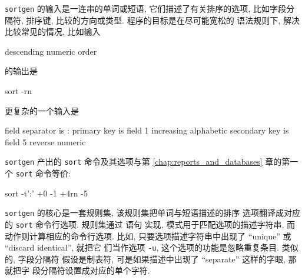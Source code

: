 \texttt{sortgen} 的输入是一连串的单词或短语, 它们描述了有关排序的选项,
比如字段分隔符, 排序键, 比较的方向或类型. 程序的目标是在尽可能宽松的
语法规则下, 解决比较常见的情况, 比如输入
\begin{awkcode}
    descending numeric order
\end{awkcode}
的输出是
\begin{awkcode}
    sort -rn
\end{awkcode}
更复杂的一个输入是
\begin{awkcode}
    field separator is :
    primary key is field 1
        increasing alphabetic
    secondary key is field 5
        reverse numeric
\end{awkcode}
\texttt{sortgen} 产出的 \texttt{sort} 命令及其选项与第
\ref{chap:reports_and_databases} 章的第一个 \texttt{sort} 命令等价:
\begin{awkcode}
    sort -t':' +0 -1 +4rn -5
\end{awkcode}

\texttt{sortgen} 的核心是一套规则集, 该规则集把单词与短语描述的排序
选项翻译成对应的 \texttt{sort} 命令行选项. 规则集通过 \patact 语句
实现, 模式用于匹配选项的描述字符串, 而动作则计算相应的命令行选项. 比如,
只要选项描述字符串中出现了 ``unique'' 或 ``discard identical'', 就把它
们当作选项 \texttt{-u}, 这个选项的功能是忽略重复条目. 类似的, 字段分隔符
假设是制表符, 可是如果描述中出现了 ``separate'' 这样的字眼, 那就把字
段分隔符设置成对应的单个字符.

